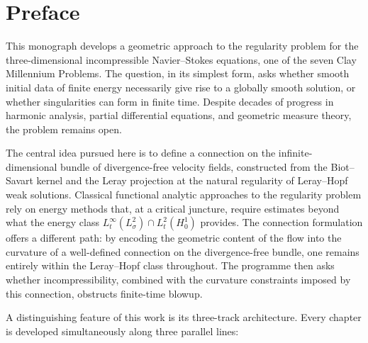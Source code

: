 \chapter*{Preface}

This monograph develops a geometric approach to the regularity problem for
the three-dimensional incompressible Navier--Stokes equations, one of the
seven Clay Millennium Problems.  The question, in its simplest form, asks
whether smooth initial data of finite energy necessarily give rise to a
globally smooth solution, or whether singularities can form in finite time.
Despite decades of progress in harmonic analysis, partial differential
equations, and geometric measure theory, the problem remains open.

\medskip

The central idea pursued here is to define a connection on the
infinite-dimensional bundle of divergence-free velocity fields, constructed
from the Biot--Savart kernel and the Leray projection at the natural
regularity of Leray--Hopf weak solutions.  Classical functional analytic
approaches to the regularity problem rely on energy methods that, at a
critical juncture, require estimates beyond what the energy class
$L^{\infty}_{t}(L^{2}_{\sigma}) \cap L^{2}_{t}(H^{1}_{0})$ provides.
The connection formulation offers a different path: by encoding the
geometric content of the flow into the curvature of a well-defined
connection on the divergence-free bundle, one remains entirely within the
Leray--Hopf class throughout.  The programme then asks whether
incompressibility, combined with the curvature constraints imposed by this
connection, obstructs finite-time blowup.

\medskip

A distinguishing feature of this work is its three-track architecture.
Every chapter is developed simultaneously along three parallel lines:

